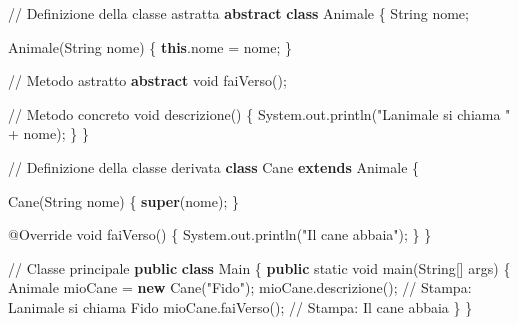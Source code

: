 \documentclass[
  letterpaper,
  DIV=11,
  numbers=noendperiod]{scrreprt}
\newenvironment{Shaded}{\begin{snugshade}}{\end{snugshade}}
\newcommand{\AttributeTok}[1]{\textcolor[rgb]{0.40,0.45,0.13}{#1}}
\newcommand{\BuiltInTok}[1]{\textcolor[rgb]{0.00,0.23,0.31}{#1}}
\newcommand{\CommentTok}[1]{\textcolor[rgb]{0.37,0.37,0.37}{#1}}
\newcommand{\DataTypeTok}[1]{\textcolor[rgb]{0.68,0.00,0.00}{#1}}
\newcommand{\FunctionTok}[1]{\textcolor[rgb]{0.28,0.35,0.67}{#1}}
\newcommand{\KeywordTok}[1]{\textcolor[rgb]{0.00,0.23,0.31}{\textbf{#1}}}
\newcommand{\NormalTok}[1]{\textcolor[rgb]{0.00,0.23,0.31}{#1}}
\newcommand{\OperatorTok}[1]{\textcolor[rgb]{0.37,0.37,0.37}{#1}}
\newcommand{\StringTok}[1]{\textcolor[rgb]{0.13,0.47,0.30}{#1}}
\begin{document}
\begin{Shaded}
\begin{Highlighting}[]
\CommentTok{// Definizione della classe astratta}
\KeywordTok{abstract} \KeywordTok{class}\NormalTok{ Animale }\OperatorTok{\{}
    \BuiltInTok{String}\NormalTok{ nome}\OperatorTok{;}

    \FunctionTok{Animale}\OperatorTok{(}\BuiltInTok{String}\NormalTok{ nome}\OperatorTok{)} \OperatorTok{\{}
        \KeywordTok{this}\OperatorTok{.}\FunctionTok{nome} \OperatorTok{=}\NormalTok{ nome}\OperatorTok{;}
    \OperatorTok{\}}

    \CommentTok{// Metodo astratto}
    \KeywordTok{abstract} \DataTypeTok{void} \FunctionTok{faiVerso}\OperatorTok{();}

    \CommentTok{// Metodo concreto}
    \DataTypeTok{void} \FunctionTok{descrizione}\OperatorTok{()} \OperatorTok{\{}
        \BuiltInTok{System}\OperatorTok{.}\FunctionTok{out}\OperatorTok{.}\FunctionTok{println}\OperatorTok{(}\StringTok{"L\textquotesingle{}animale si chiama "} \OperatorTok{+}\NormalTok{ nome}\OperatorTok{);}
    \OperatorTok{\}}
\OperatorTok{\}}

\CommentTok{// Definizione della classe derivata}
\KeywordTok{class}\NormalTok{ Cane }\KeywordTok{extends}\NormalTok{ Animale }\OperatorTok{\{}

    \FunctionTok{Cane}\OperatorTok{(}\BuiltInTok{String}\NormalTok{ nome}\OperatorTok{)} \OperatorTok{\{}
        \KeywordTok{super}\OperatorTok{(}\NormalTok{nome}\OperatorTok{);}
    \OperatorTok{\}}

    \AttributeTok{@Override}
    \DataTypeTok{void} \FunctionTok{faiVerso}\OperatorTok{()} \OperatorTok{\{}
        \BuiltInTok{System}\OperatorTok{.}\FunctionTok{out}\OperatorTok{.}\FunctionTok{println}\OperatorTok{(}\StringTok{"Il cane abbaia"}\OperatorTok{);}
    \OperatorTok{\}}
\OperatorTok{\}}

\CommentTok{// Classe principale}
\KeywordTok{public} \KeywordTok{class}\NormalTok{ Main }\OperatorTok{\{}
    \KeywordTok{public} \DataTypeTok{static} \DataTypeTok{void} \FunctionTok{main}\OperatorTok{(}\BuiltInTok{String}\OperatorTok{[]}\NormalTok{ args}\OperatorTok{)} \OperatorTok{\{}
\NormalTok{        Animale mioCane }\OperatorTok{=} \KeywordTok{new} \FunctionTok{Cane}\OperatorTok{(}\StringTok{"Fido"}\OperatorTok{);}
\NormalTok{        mioCane}\OperatorTok{.}\FunctionTok{descrizione}\OperatorTok{();} \CommentTok{// Stampa: L\textquotesingle{}animale si chiama Fido}
\NormalTok{        mioCane}\OperatorTok{.}\FunctionTok{faiVerso}\OperatorTok{();}    \CommentTok{// Stampa: Il cane abbaia}
    \OperatorTok{\}}
\OperatorTok{\}}
\end{Highlighting}
\end{Shaded}
\end{document}
